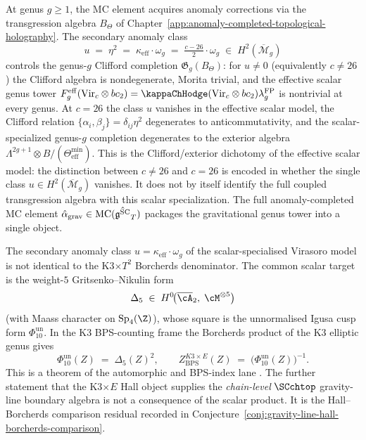 At genus $g \ge 1$, the MC element acquires anomaly corrections via
the transgression algebra $B_\Theta$ of
Chapter~\ref{app:anomaly-completed-topological-holography}.
The secondary anomaly class
\[
u \;=\; \eta^2 \;=\; \kappa_{\mathrm{eff}} \cdot \omega_g
\;=\; \tfrac{c-26}{2} \cdot \omega_g
\;\in\; H^2(\overline{\mathcal{M}}_g)
\]
controls the genus-$g$ Clifford completion
$\mathfrak{G}_g(B_\Theta)$: for $u \neq 0$
(equivalently $c \neq 26$) the Clifford algebra is
nondegenerate, Morita trivial, and the effective scalar genus tower
$F_g^{\mathrm{eff}}(\mathrm{Vir}_c\otimes bc_2)
= \kappaChHodge(\mathrm{Vir}_c\otimes bc_2)
\lambda_g^{\mathrm{FP}}$ is nontrivial at every
genus. At $c = 26$ the class $u$ vanishes in the effective scalar
model, the Clifford relation
$\{\alpha_i,\beta_j\} = \delta_{ij}\eta^2$ degenerates to
anticommutativity, and the scalar-specialized genus-$g$ completion
degenerates to the exterior algebra
$\Lambda^{2g+1} \otimes B/(\Theta_{\mathrm{eff}}^{\min})$.
This is the Clifford/exterior dichotomy of the effective scalar
model: the distinction between $c \neq 26$ and $c = 26$ is encoded in
whether the single class $u \in H^2(\overline{\mathcal{M}}_g)$
vanishes. It does not by itself identify the full coupled
transgression algebra with this scalar specialization.
The full anomaly-completed MC element
$\hat\alpha_{\mathrm{grav}} \in \operatorname{MC}(\hat{\mathfrak{g}^{\mathrm{SC}}}_T)$ packages
the gravitational genus tower into a single object.

\begin{remark}
\label{rem:3dqg-delta5-11d-sugra}%
%
%
%
%
The secondary anomaly class $u = \kappa_{\mathrm{eff}}\cdot\omega_g$
of the scalar-specialised Virasoro model is not identical to the
K3$\times T^2$ Borcherds denominator. The common scalar target is the
weight-$5$ Gritsenko--Nikulin form
\[
\Delta_5
\;\in\;
H^0\!\bigl(\overline{\cA}_2,\;\cM^{\otimes 5}\bigr)
\]
(with Maass character on $\mathrm{Sp}_4(\Z)$), whose square is the
unnormalised Igusa cusp form $\Phi_{10}^{\mathrm{un}}$. In the K3 BPS-counting frame the
Borcherds product of the K3 elliptic genus gives
\[
\Phi_{10}^{\mathrm{un}}(Z)
\;=\;
\Delta_5(Z)^2,
\qquad
Z_{\mathrm{BPS}}^{K3\times E}(Z)
\;=\;
\bigl(\Phi_{10}^{\mathrm{un}}(Z)\bigr)^{-1}.
\]
This is a theorem of the automorphic and BPS-index lane
\cite{GritsenkoNikulin1998,Borcherds1998,
DijkgraafMooreVerlindeVerlinde1997}. The further statement that the
K3$\times E$ Hall object supplies the \emph{chain-level}
$\SCchtop$ gravity-line boundary algebra is not a consequence of the
scalar product. It is the Hall--Borcherds comparison residual recorded
in Conjecture~\ref{conj:gravity-line-hall-borcherds-comparison}.
\end{remark}

